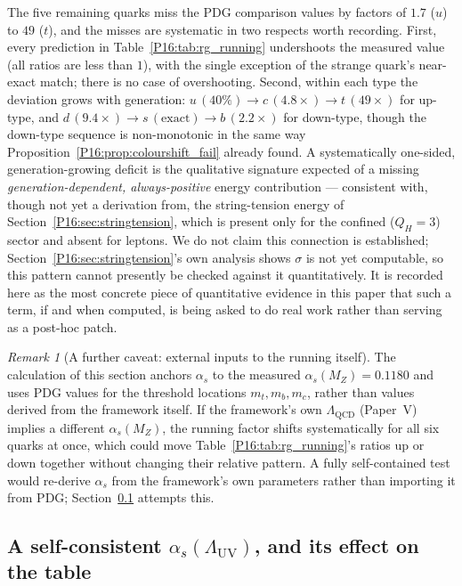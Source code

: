 \documentclass[11pt,a4paper]{article}
\theoremstyle{definition}\newtheorem{definition}[theorem]{Definition}
\theoremstyle{remark}
\newtheorem{remark}[theorem]{Remark}
\theoremstyle{definition}\newtheorem{construction}[theorem]{Construction}
\newcommand{\LUV}{\Lambda_{\mathrm{UV}}}
\newcommand{\QH}{Q_H}
\begin{document}
The five remaining quarks miss the PDG comparison values by factors of
$1.7$ ($u$) to $49$ ($t$), and the misses are systematic in two
respects worth recording. First, every prediction in
Table~\ref{P16:tab:rg_running} undershoots the measured value (all ratios
are less than $1$), with the single exception of the strange quark's
near-exact match; there is no case of overshooting. Second, within
each type the deviation grows with generation: $u\,(40\%)\to
c\,(4.8\times)\to t\,(49\times)$ for up-type, and $d\,(9.4\times)\to
s\,(\mathrm{exact})\to b\,(2.2\times)$ for down-type, though the
down-type sequence is non-monotonic in the same way
Proposition~\ref{P16:prop:colourshift_fail} already found. A
systematically one-sided, generation-growing deficit is the
qualitative signature expected of a missing
\emph{generation-dependent, always-positive} energy contribution ---
consistent with, though not yet a derivation from, the string-tension
energy of Section~\ref{P16:sec:stringtension}, which is present only for
the confined ($\QH=3$) sector and absent for leptons. We do not claim
this connection is established; Section~\ref{P16:sec:stringtension}'s own
analysis shows $\sigma$ is not yet computable, so this pattern cannot
presently be checked against it quantitatively. It is recorded here
as the most concrete piece of quantitative evidence in this paper that
such a term, if and when computed, is being asked to do real work
rather than serving as a post-hoc patch.

\begin{remark}[A further caveat: external inputs to the running
  itself]
\label{P16:rem:external_inputs}
The calculation of this section anchors $\alpha_s$ to the measured
$\alpha_s(M_Z)=0.1180$ and uses PDG values for the threshold
locations $m_t,m_b,m_c$, rather than values derived from the
framework itself. If the framework's own $\Lambda_{\mathrm{QCD}}$
(Paper~V) implies a different $\alpha_s(M_Z)$, the running factor
shifts systematically for all six quarks at once, which could move
Table~\ref{P16:tab:rg_running}'s ratios up or down together without
changing their relative pattern. A fully self-contained test would
re-derive $\alpha_s$ from the framework's own parameters rather than
importing it from PDG; Section~\ref{P16:sec:selfconsistent_as} attempts
this.
\end{remark}

\subsection{A self-consistent $\alpha_s(\LUV)$, and its effect on the
  table}
\label{P16:sec:selfconsistent_as}
\end{document}
